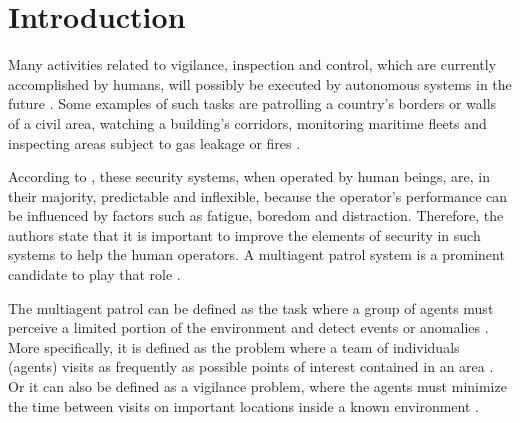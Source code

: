 \chapter{Introduction}
\label{chp:introduction}


Many activities related to vigilance, inspection and control, which are currently 
accomplished by humans, will possibly be executed by autonomous systems in the future 
\citep{hernandez2013game}. Some examples of such tasks are patrolling a country’s borders 
or walls of a civil area, watching a building’s corridors, monitoring maritime fleets and 
inspecting areas subject to gas leakage or fires \citep{sampaiophd}.

According to \citep{hernandez2013game}, these security systems, when operated by human 
beings, are, in their majority, predictable and inflexible, because the operator’s performance 
can be influenced by factors such as fatigue, boredom and distraction. Therefore, the authors 
state that it is important to improve the elements of security in such systems to help the 
human operators. A multiagent patrol system is a prominent candidate to play that role 
\citep{Chevaleyre:2004:TAM:1018411.1019013}.

The multiagent patrol can be defined as the task where a group of agents must perceive a 
limited portion of the environment and detect events or anomalies \citep{6315145}. More 
specifically, it is defined as the problem where a team of individuals (agents) visits as 
frequently as possible points of interest contained in an area \citep{6495145}. Or it can 
also be defined as a vigilance problem, where the agents must minimize the time between 
visits on important locations inside a known environment \citep{Pippin:2013:PBT:2480362.2480378}.